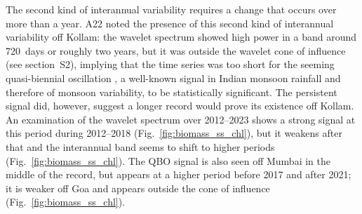 \documentclass[authoryear,review,11pt]{elsarticle}
\begin{document}
The second kind of interannual variability requires a change that occurs over more than a year. A22 noted the presence of this second kind of interannual variability off Kollam: the wavelet spectrum showed high power in a band around 720~days or roughly two years, but it was outside the wavelet cone of influence (see section~S2), implying that the time series was too short for the seeming quasi-biennial oscillation \citep[QBO;][]{mooley1984fluctuations, bhalme1987tropical}, a well-known signal in Indian monsoon rainfall and therefore of monsoon variability, to be statistically significant.  The persistent signal did, however, suggest a longer record would prove its existence off Kollam.  An examination of the wavelet spectrum over 2012--2023 shows a strong signal at this period during 2012--2018 (Fig.~\ref{fig:biomass_ss_chl}), but it weakens after that and the interannual band seems to shift to higher periods (Fig.~\ref{fig:biomass_ss_chl}).  The QBO signal is also seen off Mumbai in the middle of the record, but appears at a higher period before 2017 and after 2021; it is weaker off Goa and appears outside the cone of influence (Fig.~\ref{fig:biomass_ss_chl}).



\end{document}

